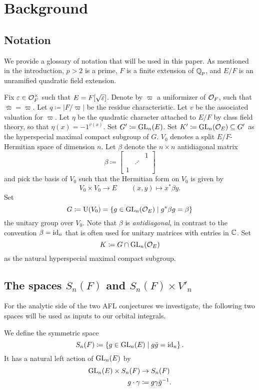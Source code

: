 \section{Background}
\label{sec:background}

\subsection{Notation}
We provide a glossary of notation that will be used in this paper.
As mentioned in the introduction, $p > 2$ is a prime,
$F$ is a finite extension of $\mathbb Q_p$,
and $E/F$ is an unramified quadratic field extension.

\begin{itemize}
  \ii Fix $\varepsilon \in \mathcal O_F^\times$ such that $E = F[\sqrt{\varepsilon}]$.
  \ii Denote by $\varpi$ a uniformizer of $\mathcal O_F$, such that $\bar \varpi = \varpi$.
  \ii Let $q \coloneqq |F/\varpi|$ be the residue characteristic.
  \ii Let $v$ be the associated valuation for $\varpi$.
  \ii Let $\eta$ be the quadratic character attached to $E/F$ by class field theory,
  so that $\eta(x) = -1^{v(x)}$.
  \ii Set $G' \coloneqq \operatorname{GL}_n(E)$.
  \ii Set $K' \coloneqq \operatorname{GL}_n(\mathcal O_E) \subseteq G'$ as the hyperspecial maximal compact subgroup of $G$.
  \ii $V_0$ denotes a split $E/F$-Hermitian space of dimension $n$.
  \ii Let $\beta$ denote the $n \times n$ antidiagonal matrix
  \[ \beta \coloneqq \begin{bmatrix} && 1 \\ & \iddots \\ 1 \end{bmatrix} \]
  and pick the basis of $V_0$ such that the Hermitian form on $V_0$ is given by
  \[ V_0 \times V_0 \to E \qquad (x,y) \mapsto x^\ast \beta y. \]
  \ii Set
  \[ G \coloneqq \operatorname{U}(V_0) = \{ g \in \operatorname{GL}_n(\mathcal O_E) \mid g^\ast \beta g = \beta\} \]
  the unitary group over $V_0$.
  Note that $\beta$ is \emph{antidiagonal}, in contrast to the convention $\beta = \operatorname{id}_n$
  that is often used for unitary matrices with entries in $\mathbb C$.
  \ii Set
  \[ K \coloneqq G \cap \operatorname{GL}_n(\mathcal O_E) \]
  as the natural hyperspecial maximal compact subgroup.
\end{itemize}

\subsection{The spaces $S_n(F)$ and $S_n(F) \times V'_n$}
For the analytic side of the two AFL conjectures we investigate,
the following two spaces will be used as inputs to our orbital integrals.
\begin{definition}
  We define the symmetric space
  \[ S_n(F) \coloneqq \left\{ g \in \operatorname{GL}_n(E) \mid g \bar g = \operatorname{id}_n \right\}. \]
  It has a natural left action of $\operatorname{GL}_n(E)$ by
  \begin{align*}
    \operatorname{GL}_n(E) \times S_n(F) &\to S_n(F) \\
    g \cdot \gamma &\coloneqq g \gamma \bar g^{-1}.
  \end{align*}
\end{definition}

